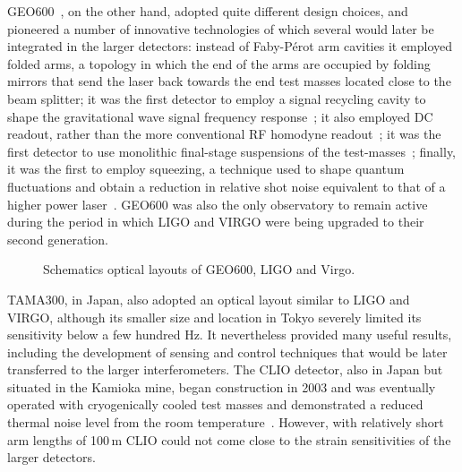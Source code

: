 GEO600~\cite{Grote_2010}, on the other hand, adopted quite different design choices, and pioneered a number of innovative technologies of which several would later be integrated in the larger detectors:
instead of Faby-P\'{e}rot arm cavities it employed folded arms, a topology in which the end of the arms are occupied by folding mirrors that send the laser back towards the end test masses located close to the beam splitter;
it was the first detector to employ a signal recycling cavity to shape the gravitational wave signal frequency response~\cite{Willke_2002};
it also employed DC readout, rather than the more conventional RF homodyne readout~\cite{DCreadout};
it was the first detector to use monolithic final-stage suspensions of the test-masses~\cite{Plissi_2000};
finally, it was the first to employ squeezing, a technique used to shape quantum fluctuations and obtain a reduction in relative shot noise equivalent to that of a higher power laser~\cite{Grote_2013}.
GEO600 was also the only observatory to remain active during the period in which LIGO and VIRGO were being upgraded to their second generation.
\begin{figure}[htb]
	\caption{\label{fig:opticallayouts}Schematics optical layouts of GEO600, LIGO and Virgo.}
\end{figure}


TAMA300\cite{Ando_2002}, in Japan, also adopted an optical layout similar to LIGO and VIRGO, although its smaller size and location in Tokyo severely limited its sensitivity below a few hundred Hz.
It nevertheless provided many useful results, including the development of sensing and control techniques that would be later transferred to the larger interferometers. 
The CLIO detector, also in Japan but situated in the Kamioka mine, began construction in 2003 and was eventually operated with cryogenically cooled test masses and demonstrated a reduced thermal noise level from the room temperature~\cite{Uchiyama_2012}. However, with relatively short arm lengths of 100\,m CLIO could not come close to the strain sensitivities of the larger detectors.

